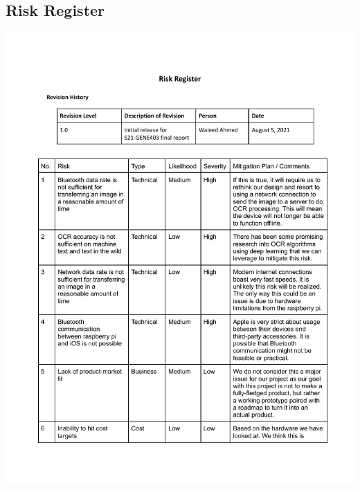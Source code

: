 \documentclass[a4paper,11pt]{article}
\begin{document}
\subsection{Risk Register}
\includegraphics[page=1,width={1.0\linewidth}]{pdf/risk-register-1.0.pdf}
\newpage
\end{document}
